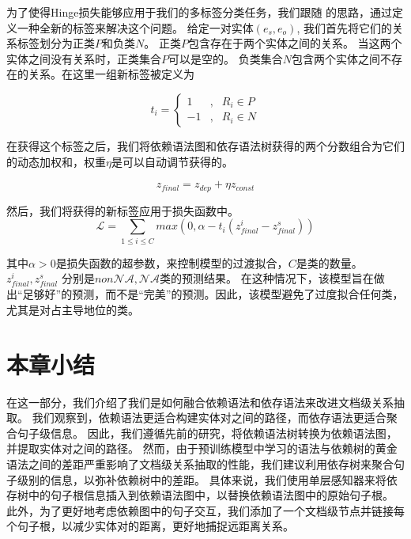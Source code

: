 \documentclass[bachelor]{thesis-uestc}
\begin{document}
为了使得Hinge损失能够应用于我们的多标签分类任务，我们跟随 \cite{SagDRE} 的思路，通过定义一种全新的标签来解决这个问题。
给定一对实体$(e_s, e_o)$, 我们首先将它们的关系标签划分为正类$P$和负类$N$。
正类$P$包含存在于两个实体之间的关系。
当这两个实体之间没有关系时，正类集合$P$可以是空的。
负类集合$N$包含两个实体之间不存在的关系。在这里一组新标签被定义为

\begin{equation}
    t_i = \left\{
	\begin{aligned}
		1 & , & R_i \in P \\
        -1 & , & R_i \in N
    \end{aligned}
	\right.
\end{equation}\par
在获得这个标签之后，我们将依赖语法图和依存语法树获得的两个分数组合为它们的动态加权和，权重$\eta$是可以自动调节获得的。

\begin{equation}
    \label{eta}
    z_{final} = z_{dep} + \eta z_{const}
\end{equation}
\par 
然后，我们将获得的新标签应用于损失函数中。
\begin{equation}
    \label{loss}
    \mathcal{L} = \sum_{1 \le i \le C} max(0, \alpha-t_i(z^i_{final} - z^s_{final}))
\end{equation}

其中$\alpha>0$是损失函数的超参数，来控制模型的过渡拟合，$C$是类的数量。$z^i_{final}, z^s_{final}$ 分别是$non\mathcal{NA}, \mathcal{NA}$类的预测结果。
在这种情况下，该模型旨在做出“足够好”的预测，而不是“完美”的预测。因此，该模型避免了过度拟合任何类，尤其是对占主导地位的类。\par

\section{本章小结}
在这一部分，我们介绍了我们是如何融合依赖语法和依存语法来改进文档级关系抽取。
我们观察到，依赖语法更适合构建实体对之间的路径，而依存语法更适合聚合句子级信息。
因此，我们遵循先前的研究，将依赖语法树转换为依赖语法图，并提取实体对之间的路径。
然而，由于预训练模型中学习的语法与依赖树的黄金语法之间的差距严重影响了文档级关系抽取的性能，我们建议利用依存树来聚合句子级别的信息，以弥补依赖树中的差距。
具体来说，我们使用单层感知器来将依存树中的句子根信息插入到依赖语法图中，以替换依赖语法图中的原始句子根。
此外，为了更好地考虑依赖图中的句子交互，我们添加了一个文档级节点并链接每个句子根，以减少实体对的距离，更好地捕捉远距离关系。
\end{document}
